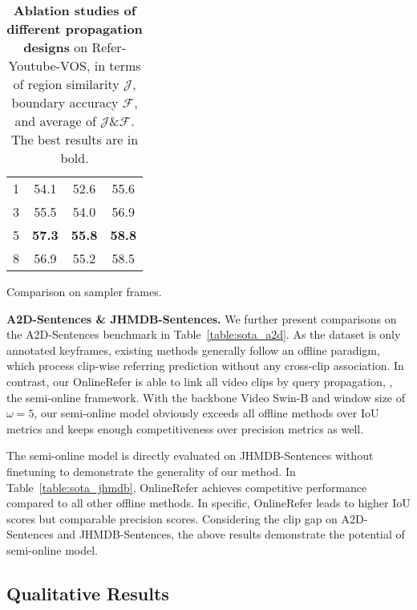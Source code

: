 \documentclass[10pt,twocolumn,letterpaper]{article}
\begin{document}
\begin{table*}[t!]
\begin{center}
\begin{subtable}[t]{0.3\linewidth}
\begin{tabular}{c|ccc}
 	1 & 54.1 & 52.6 & 55.6 \\
        3 & 55.5 & 54.0 & 56.9 \\
        \rowcolor[gray]{0.9}
        5 & \textbf{57.3} & \textbf{55.8} & \textbf{58.8} \\
        8 & 56.9 & 55.2 & 58.5 \\
        \hline
        \end{tabular}
        \vspace{-0.5mm}
        \caption{Comparison on sampler frames. }
        \label{table:3c}
    \end{subtable}
\end{center}
\vspace{-18pt}
  \caption{
    \textbf{Ablation studies of different propagation designs} on Refer-Youtube-VOS, in terms of region similarity $\mathcal{J}$, boundary accuracy $\mathcal{F}$, and average of $\mathcal{J}$\&$\mathcal{F}$. The best results are in bold.
    }
    \vspace{-4mm}
\end{table*}

\noindent\textbf{A2D-Sentences \& JHMDB-Sentences.}
We further present comparisons on the A2D-Sentences benchmark in Table~\ref{table:sota_a2d}.
As the dataset is only annotated keyframes, existing methods generally follow an offline paradigm, which process clip-wise referring prediction without any cross-clip association.
In contrast, our OnlineRefer is able to link all video clips by query propagation, \ie, the semi-online framework.
With the backbone Video Swin-B and window size of $\omega\!=\!5$, our semi-online model obviously exceeds all offline methods over IoU metrics and keeps enough competitiveness over precision metrics as well.


The semi-online model is directly evaluated on JHMDB-Sentences without finetuning to  demonstrate the generality of our method. In Table~\ref{table:sota_jhmdb}, OnlineRefer achieves competitive performance compared to all other offline methods.
In specific, OnlineRefer leads to higher IoU scores but comparable precision scores.
Considering the clip gap on A2D-Sentences and JHMDB-Sentences, the above results demonstrate the potential of semi-online model.










\subsection{Qualitative Results}
\end{document}
